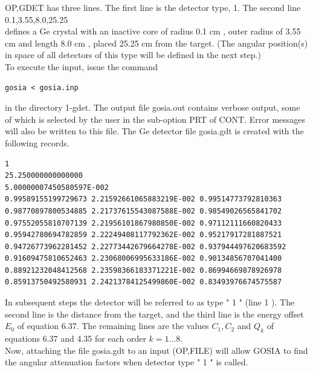 \documentclass[10pt]{article}
\begin{document}
OP,GDET has three lines. The first line is the detector type, 1. The second line\\
0.1,3.55,8.0,25.25\\
defines a Ge crystal with an inactive core of radius 0.1 cm , outer radius of 3.55 cm and length 8.0 cm , placed 25.25 cm from the target. (The angular position(s) in space of all detectors of this type will be defined in the next step.)\\
To execute the input, issue the command

\begin{verbatim}
gosia < gosia.inp
\end{verbatim}

in the directory 1-gdet. The output file gosia.out contains verbose output, some of which is selected by the user in the sub-option PRT of CONT. Error messages will also be written to this file. The Ge detector file gosia.gdt is created with the following records.

\begin{verbatim}
1
25.250000000000000
5.00000007450580597E-002
0.99589155199729673 2.21592661065883219E-002 0.99514773792810363
0.98770897800534885 2.21737615543087588E-002 0.98549026565841702
0.97552055810707139 2.21956101867980850E-002 0.97112111660820433
0.95942780694782859 2.22249408117792362E-002 0.95217917281887521
0.94726773962281452 2.22773442679664278E-002 0.937944497620683592
0.91609475810652463 2.23068006995633186E-002 0.90134856707041400
0.88921232048412568 2.23598366183371221E-002 0.86994669878926978
0.85913750492580931 2.24213784125499860E-002 0.83493976674575587
\end{verbatim}

In subsequent steps the detector will be referred to as type " 1 " (line 1 ). The second line is the distance from the target, and the third line is the energy offset $E_{0}$ of equation 6.37. The remaining lines are the values $C_{1}, C_{2}$ and $Q_{k}$ of equations 6.37 and 4.35 for each order $k=1 \ldots 8$.\\
Now, attaching the file gosia.gdt to an input (OP,FILE) will allow GOSIA to find the angular attenuation factors when detector type " 1 " is called.
\end{document}
